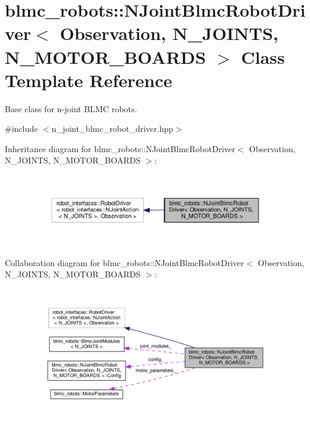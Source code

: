 \hypertarget{classblmc__robots_1_1NJointBlmcRobotDriver}{}\section{blmc\+\_\+robots\+:\+:N\+Joint\+Blmc\+Robot\+Driver$<$ Observation, N\+\_\+\+J\+O\+I\+N\+TS, N\+\_\+\+M\+O\+T\+O\+R\+\_\+\+B\+O\+A\+R\+DS $>$ Class Template Reference}
\label{classblmc__robots_1_1NJointBlmcRobotDriver}


Base class for n-\/joint B\+L\+MC robots.  




{\ttfamily \#include $<$n\+\_\+joint\+\_\+blmc\+\_\+robot\+\_\+driver.\+hpp$>$}



Inheritance diagram for blmc\+\_\+robots\+:\+:N\+Joint\+Blmc\+Robot\+Driver$<$ Observation, N\+\_\+\+J\+O\+I\+N\+TS, N\+\_\+\+M\+O\+T\+O\+R\+\_\+\+B\+O\+A\+R\+DS $>$\+:
\nopagebreak
\begin{figure}[H]
\begin{center}
\leavevmode
\includegraphics[width=350pt]{classblmc__robots_1_1NJointBlmcRobotDriver__inherit__graph}
\end{center}
\end{figure}


Collaboration diagram for blmc\+\_\+robots\+:\+:N\+Joint\+Blmc\+Robot\+Driver$<$ Observation, N\+\_\+\+J\+O\+I\+N\+TS, N\+\_\+\+M\+O\+T\+O\+R\+\_\+\+B\+O\+A\+R\+DS $>$\+:
\nopagebreak
\begin{figure}[H]
\begin{center}
\leavevmode
\includegraphics[width=350pt]{classblmc__robots_1_1NJointBlmcRobotDriver__coll__graph}
\end{center}
\end{figure}
